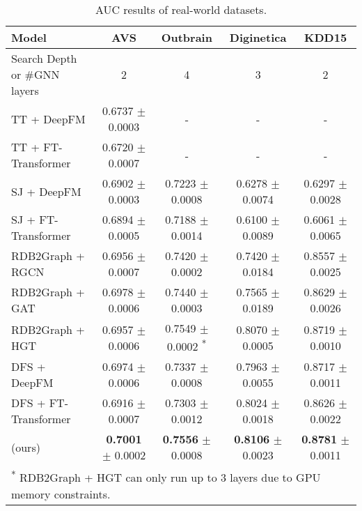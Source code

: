 \begin{table*}[ht]
    \caption{AUC results of real-world datasets.
    }
    \centering
    \renewcommand\arraystretch{1.25}
    \begin{tabular}{l|c|c|c|c}
        \toprule
        Model & \textbf{AVS} & \textbf{Outbrain} & \textbf{Diginetica} & \textbf{KDD15} \\
        \midrule
        Search Depth or \#GNN layers & 2 & 4 & 3 & 2 \\
        \midrule
        TT + DeepFM & 0.6737 $\pm$ 0.0003 & -                   & -                   & -            \\
        TT + FT-Transformer   & 0.6720 $\pm$ 0.0007 & -                   & -                   & -  \\
        SJ + DeepFM & 0.6902 $\pm$ 0.0003 & 0.7223 $\pm$ 0.0008 & 0.6278 $\pm$ 0.0074 & 0.6297 $\pm$ 0.0028 \\
        SJ + FT-Transformer   & 0.6894 $\pm$ 0.0005 & 0.7188 $\pm$ 0.0014 & 0.6100 $\pm$ 0.0089 & 0.6061 $\pm$ 0.0065\\
        \midrule
        RDB2Graph + RGCN & 0.6956 $\pm$ 0.0007 & 0.7420 $\pm$ 0.0002 & 0.7420 $\pm$ 0.0184 & 0.8557 $\pm$ 0.0025\\
        RDB2Graph + GAT  & 0.6978 $\pm$ 0.0006 & 0.7440 $\pm$ 0.0003 & 0.7565 $\pm$ 0.0189 & 0.8629 $\pm$ 0.0026\\
        RDB2Graph + HGT  & 0.6957 $\pm$ 0.0006 & 0.7549 $\pm$ 0.0002 \textsuperscript{*} & 0.8070 $\pm$ 0.0005 & 0.8719 $\pm$ 0.0010\\
        \midrule
        DFS + DeepFM & 0.6974 $\pm$ 0.0006 & 0.7337 $\pm$ 0.0008 & 0.7963 $\pm$ 0.0055 & 0.8717 $\pm$ 0.0011\\
        DFS + FT-Transformer   & 0.6916 $\pm$ 0.0007 & 0.7303 $\pm$ 0.0012 & 0.8024 $\pm$ 0.0018 & 0.8626 $\pm$ 0.0022\\
        \midrule
        \model{} (ours) & \textbf{0.7001} $\pm$ 0.0002 & \textbf{0.7556} $\pm$ 0.0008 & \textbf{0.8106} $\pm$ 0.0023 & \textbf{0.8781} $\pm$ 0.0011\\
        \bottomrule
        \multicolumn{5}{l}{\textsuperscript{*} RDB2Graph + HGT can only run up to 3 layers due to GPU memory constraints.} %
    \end{tabular}
    \label{tab:real_dataset}
\end{table*}


